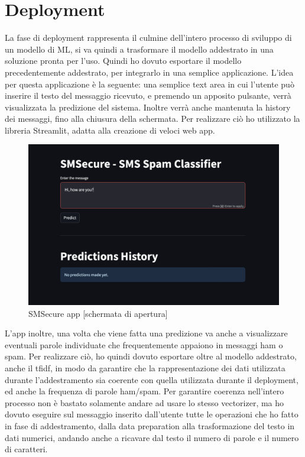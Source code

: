 \documentclass[]{article}
\begin{document}
        \newpage
        \section{Deployment}
            La fase di deployment rappresenta il culmine dell'intero processo di sviluppo di un modello di ML, si va quindi a trasformare il modello addestrato in una soluzione pronta per l'uso. Quindi ho dovuto esportare il modello precedentemente addestrato, per integrarlo in una semplice applicazione. L'idea per questa applicazione è la seguente: una semplice text area in cui l'utente può inserire il testo del messaggio ricevuto, e premendo un apposito pulsante, verrà visualizzata la predizione del sistema. Inoltre verrà anche mantenuta la history dei messaggi, fino alla chiusura della schermata. Per realizzare ciò ho utilizzato la libreria Streamlit, adatta alla creazione di veloci web app.
            \begin{figure}[H]
                \centering
                \includegraphics[width=1\linewidth]{images/app.png}
                \caption{SMSecure app [schermata di apertura]}
                \label{fig:enter-label}
            \end{figure}
            L'app inoltre, una volta che viene fatta una predizione va anche a visualizzare eventuali parole individuate che frequentemente appaiono in messaggi ham o spam.
            Per realizzare ciò, ho quindi dovuto esportare oltre al modello addestrato, anche il tfidf, in modo da garantire che la rappresentazione dei dati utilizzata durante l'addestramento sia coerente con quella utilizzata durante il deployment, ed anche la frequenza di parole ham/spam. Per garantire coerenza nell'intero processo non è bastato solamente andare ad usare lo stesso vectorizer, ma ho dovuto eseguire sul messaggio inserito dall'utente tutte le operazioni che ho fatto in fase di addestramento, dalla data preparation alla trasformazione del testo in dati numerici, andando anche a ricavare dal testo il numero di parole e il numero di caratteri.
\end{document}
